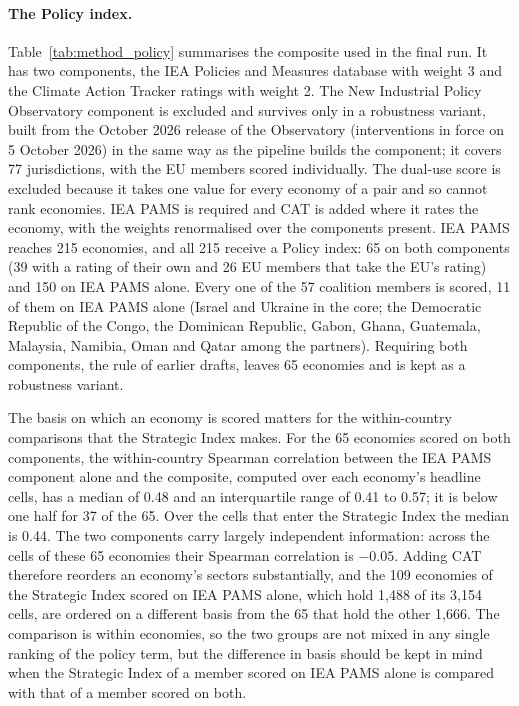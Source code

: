 \paragraph{The Policy index.} Table~\ref{tab:method_policy} summarises the composite used in
the final run. It has two components, the IEA Policies and Measures database
\citep{iea2026pams} with weight 3 and the Climate Action Tracker ratings \citep{cat2026ratings}
with weight 2. The New Industrial Policy Observatory component \citep{gta2026nipo} is excluded
and survives only in a robustness variant, built from the October 2026 release of the Observatory
(interventions in force on 5 October 2026) in the same way as the pipeline builds the component;
it covers 77 jurisdictions, with the EU members scored individually. The dual-use score is
excluded because it takes one value for every economy of a pair and so cannot rank economies. IEA PAMS is required and CAT is added where it
rates the economy, with the weights renormalised over the components present. IEA PAMS reaches
215 economies, and all 215 receive a Policy index: 65 on both components (39 with a rating of
their own and 26 EU members that take the EU's rating) and 150 on IEA PAMS alone. Every one of
the 57 coalition members is scored, 11 of them on IEA PAMS alone (Israel and Ukraine in the core;
the Democratic Republic of the Congo, the Dominican Republic, Gabon, Ghana, Guatemala, Malaysia,
Namibia, Oman and Qatar among the partners). Requiring both components, the rule of earlier
drafts, leaves 65 economies and is kept as a robustness variant.

The basis on which an economy is scored matters for the within-country comparisons that the
Strategic Index makes. For the 65 economies scored on both components, the within-country
Spearman correlation between the IEA PAMS component alone and the composite, computed over each
economy's headline cells, has a median of 0.48 and an interquartile range of 0.41 to 0.57; it is
below one half for 37 of the 65. Over the cells that enter the Strategic Index the median is
0.44. The two components carry largely independent information: across the cells of these 65
economies their Spearman correlation is $-0.05$. Adding CAT therefore reorders an economy's
sectors substantially, and the 109 economies of the Strategic Index scored on IEA PAMS alone,
which hold 1,488 of its 3,154 cells, are ordered on a different basis from the 65 that hold the
other 1,666. The comparison is within economies, so the two groups are not mixed in any single
ranking of the policy term, but the difference in basis should be kept in mind when the
Strategic Index of a member scored on IEA PAMS alone is compared with that of a member scored on
both.

